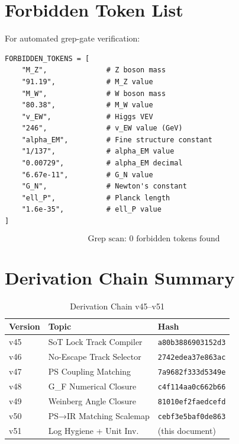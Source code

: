 \documentclass[11pt,a4paper]{article}
\theoremstyle{definition}
\begin{document}
\section{Forbidden Token List}
\label{app:forbidden}

For automated grep-gate verification:

\begin{verbatim}
FORBIDDEN_TOKENS = [
    "M_Z",              # Z boson mass
    "91.19",            # M_Z value
    "M_W",              # W boson mass
    "80.38",            # M_W value
    "v_EW",             # Higgs VEV
    "246",              # v_EW value (GeV)
    "alpha_EM",         # Fine structure constant
    "1/137",            # alpha_EM value
    "0.00729",          # alpha_EM decimal
    "6.67e-11",         # G_N value
    "G_N",              # Newton's constant
    "ell_P",            # Planck length
    "1.6e-35",          # ell_P value
]
\end{verbatim}

\begin{equation}
\label{eq:grep_result}
\text{Grep scan: } 0 \text{ forbidden tokens found}
\end{equation}

\section{Derivation Chain Summary}
\label{app:chain}

\begin{table}[h]
\centering
\caption{Derivation Chain v45--v51}
\label{tab:chain}
\begin{tabular}{@{}lll@{}}
\toprule
\textbf{Version} & \textbf{Topic} & \textbf{Hash} \\
\midrule
v45 & SoT Lock Track Compiler & \texttt{a80b3886903152d3} \\
v46 & No-Escape Track Selector & \texttt{2742edea37e863ac} \\
v47 & PS Coupling Matching & \texttt{7a9682f333d5349e} \\
v48 & G\_F Numerical Closure & \texttt{c4f114aa0c662b66} \\
v49 & Weinberg Angle Closure & \texttt{81010ef2faedcefd} \\
v50 & PS→IR Matching Scalemap & \texttt{cebf3e5baf0de863} \\
v51 & Log Hygiene + Unit Inv. & (this document) \\
\bottomrule
\end{tabular}
\end{table}
\end{document}
